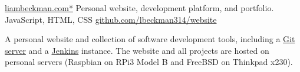 \showoff
{\textcolor{my-blue}{\href{https://liambeckman.com}{liambeckman.com*}}}
{Personal website, development platform, and portfolio.}
{JavaScript, HTML, CSS}
{\textcolor{my-blue}{\href{https://github.com/lbeckman314/website}{github.com/lbeckman314/website}}}


A personal website and collection of software development tools, including a \textcolor{my-blue}{\href{https://git.liambeckman.com/liam}{Git server}} and a \textcolor{my-blue}{\href{https://liambeckman.com/jenkins}{Jenkins}} instance. The website and all projects are hosted on personal servers (Raspbian on RPi3 Model B and FreeBSD on Thinkpad x230).

